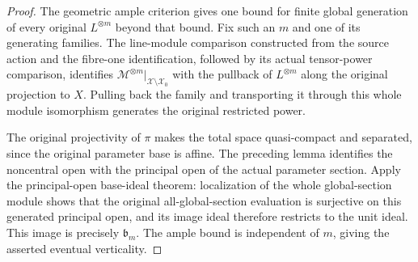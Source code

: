 \begin{proof}
The geometric ample criterion gives one bound for finite global generation
of every original $L^{\otimes m}$ beyond that bound. Fix such an $m$ and
one of its generating families. The line-module comparison constructed
from the source action and the fibre-one identification, followed by its
actual tensor-power comparison, identifies
$\mathcal M^{\otimes m}|_{\mathcal X\setminus\mathcal X_0}$ with the
pullback of $L^{\otimes m}$ along the original projection to $X$.
Pulling back the family and transporting it through this whole module
isomorphism generates the original restricted power.

The original projectivity of $\pi$ makes the total space quasi-compact
and separated, since the original parameter base is affine. The preceding
lemma identifies the noncentral open with the principal open of the
actual parameter section. Apply the principal-open base-ideal theorem:
localization of the whole global-section module shows that the original
all-global-section evaluation is surjective on this generated principal
open, and its image ideal therefore restricts to the unit ideal.
This image is precisely $\mathfrak b_m$. The ample bound is independent
of $m$, giving the asserted eventual verticality.
\end{proof}
